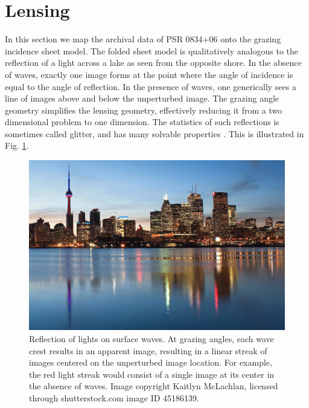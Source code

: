 \documentclass[useAMS,usenatbib]{mn2e}
\begin{document}
\section{Lensing}

In this section we map the archival data of PSR 0834+06 onto the grazing incidence sheet
model.  The folded sheet model is qualitatively analogous to the
reflection of a light across a lake as seen from the opposite
shore.
In the absence of waves, exactly one image forms at the point
where the angle of incidence is equal to the angle of reflection.  In
the presence of waves, one generically sees a line of images above and
below the unperturbed image.  The grazing angle geometry simplifies
the lensing geometry, effectively reducing it from a two dimensional problem to
one dimension.  The statistics of such reflections is sometimes called
glitter, and has many solvable
properties \citep{LonguetHiggins1960}.  This is illustrated in
Fig. \ref{fig:water_reflection}.



\begin{figure}
\centering
\includegraphics[width=1.0\linewidth, angle=0]{toronto-skyline.png}
\caption{Reflection of lights on surface waves.  At grazing angles,
 each wave crest results in an apparent image, resulting in a linear
 streak of images centered on the unperturbed image location.  For
 example, the red light streak would consist of a single image at its
 center in the absence of waves. Image copyright Kaitlyn McLachlan,
 licensed through shutterstock.com image ID 45186139.}
\label{fig:water_reflection}
\end{figure}
\end{document}
